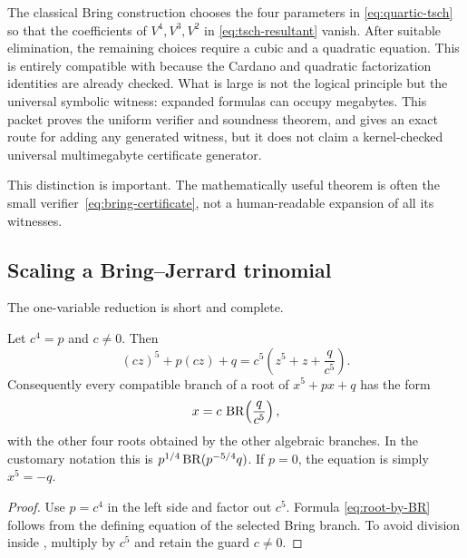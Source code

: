 \begin{frontier}
The classical Bring construction chooses the four parameters in
\eqref{eq:quartic-tsch} so that the coefficients of \(V^4,V^3,V^2\) in
\eqref{eq:tsch-resultant} vanish.  After suitable elimination, the remaining
choices require a cubic and a quadratic equation.  This is entirely compatible
with \ipra{} because the Cardano and quadratic factorization identities are
already checked.  What is large is not the logical principle but the universal
symbolic witness: expanded formulas can occupy megabytes.  This packet proves
the uniform verifier and soundness theorem, and gives an exact route for adding
any generated witness, but it does not claim a kernel-checked universal
multimegabyte certificate generator.
\end{frontier}

This distinction is important.  The mathematically useful theorem is often the
small verifier~\eqref{eq:bring-certificate}, not a human-readable expansion of
all its witnesses.

\subsection{Scaling a Bring--Jerrard trinomial}

The one-variable reduction is short and complete.

\begin{theorem}\label{thm:bring-scaling}
Let \(c^4=p\) and \(c\ne0\).  Then
\begin{equation}\label{eq:scaling-identity}
 (cz)^5+p(cz)+q
 =c^5\left(z^5+z+\frac{q}{c^5}\right).
\end{equation}
Consequently every compatible branch of a root of \(x^5+px+q\) has the form
\begin{equation}\label{eq:root-by-BR}
 x=c\,\operatorname{BR}\!\left(\frac{q}{c^5}\right),
\end{equation}
with the other four roots obtained by the other algebraic branches.  In the
customary notation this is
\(p^{1/4}\operatorname{BR}(p^{-5/4}q)\).  If \(p=0\), the equation is simply
\(x^5=-q\).
\end{theorem}

\begin{proof}
Use \(p=c^4\) in the left side and factor out \(c^5\).  Formula
\eqref{eq:root-by-BR} follows from the defining equation of the selected Bring
branch.  To avoid division inside \ipra{}, multiply by \(c^5\) and retain the
guard \(c\ne0\).
\end{proof}

